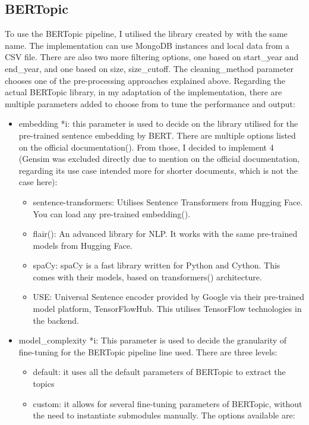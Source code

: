 \documentclass[12pt,MSc,a4paper,oneside]{muthesis}
\begin{document}
\subsection{BERTopic}
To use the BERTopic pipeline, I utilised the library created by \cite{grootendorst2020bertopic} with the same name.
The implementation can use MongoDB instances and local data from a CSV file. There are also two more filtering options, one based on start\_year and end\_year, and one based on size, size\_cutoff. The cleaning\_method parameter chooses one of the pre-processing approaches explained above. 
Regarding the actual BERTopic library, in my adaptation of the implementation, there are multiple parameters added to choose from to tune the performance and output:
\begin{itemize}
    \item embedding *i: this parameter is used to decide on the library utilised for the pre-trained sentence embedding by BERT. There are multiple options listed on the official documentation(\cite{bertopic-embeddings}). From those, I decided to implement 4 (Gensim was excluded directly due to mention on the official documentation, regarding its use case intended more for shorter documents, which is not the case here):
    \begin{itemize}
        \item sentence-transformers: Utilises Sentence Transformers from Hugging Face. You can load any pre-trained embedding(\cite{huggingface-models}).
        \item  flair(\cite{flair-nlp}): An advanced library for NLP. It works with the same pre-trained models from Hugging Face. 
        \item spaCy: spaCy is a fast library written for Python and Cython. This comes with their models, based on transformers(\cite{DBLP:journals/corr/VaswaniSPUJGKP17}) architecture.
        \item USE: Universal Sentence encoder provided by Google via their pre-trained model platform, TensorFlowHub. This utilises TensorFlow technologies in the backend.
    \end{itemize}
    \item model\_complexity *i: This parameter is used to decide the granularity of fine-tuning for the BERTopic pipeline line used. There are three levels:
    \begin{itemize}
        \item default: it uses all the default parameters of BERTopic to extract the topics
        \item  custom: it allows for several fine-tuning parameters of BERTopic, without the need to instantiate submodules manually. The options available are:

\end{itemize}
\end{itemize}
\end{document}
